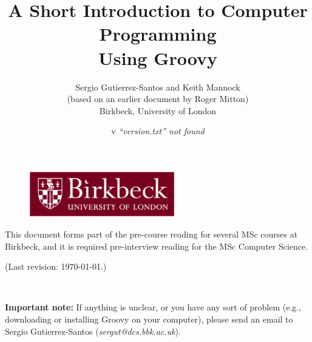 \documentclass[11pt,a4paper]{article}
\title{A Short Introduction to Computer Programming\\
  Using Groovy}
\author{Sergio Gutierrez-Santos and Keith Mannock\\
  (based on an earlier document by Roger Mitton)\\
  Birkbeck, University of London}
\date{\InputIfFileExists{version.txt}
     {v}
     {\emph{``version.txt'' not found}}}
\begin{document}

\maketitle

\thispagestyle{empty}

\vfill 

\begin{figure}[h!]  %
  \centering
  \includegraphics[height=2cm]{bbk.eps}
\end{figure}

\vfill

\noindent This document forms part of the pre-course reading for
several MSc courses at Birkbeck, and it is required pre-interview
reading for the MSc Computer Science.


\noindent (Last revision: \today.)


\newpage

~\vspace{8cm}

\textbf{Important note: } If anything is unclear, or you have any 
sort of problem (e.g.,
downloading or installing Groovy on your computer), please send an
email to Sergio Gutierrez-Santos (\emph{sergut@dcs.bbk.ac.uk}).
\newpage


\newpage


\newpage


\newpage


\newpage


\newpage


\end{document}
